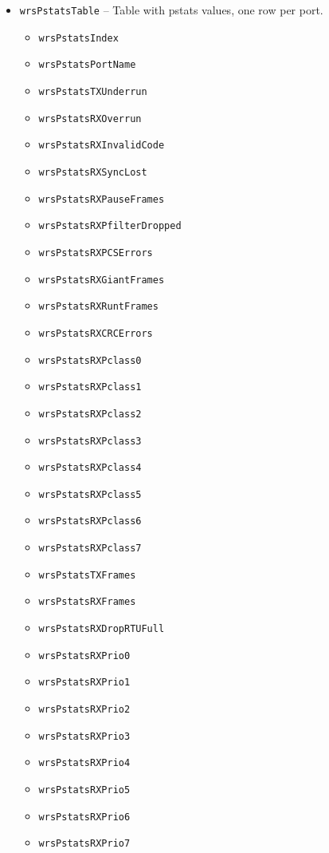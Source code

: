 \begin{itemize}
  \item \texttt{wrsPstatsTable} -- Table with pstats values, one row per port.
    \begin{itemize}
      \item \texttt{wrsPstatsIndex}
      \item \texttt{wrsPstatsPortName}
      \item \texttt{wrsPstatsTXUnderrun}
      \item \texttt{wrsPstatsRXOverrun}
      \item \texttt{wrsPstatsRXInvalidCode}
      \item \texttt{wrsPstatsRXSyncLost}
      \item \texttt{wrsPstatsRXPauseFrames}
      \item \texttt{wrsPstatsRXPfilterDropped}
      \item \texttt{wrsPstatsRXPCSErrors}
      \item \texttt{wrsPstatsRXGiantFrames}
      \item \texttt{wrsPstatsRXRuntFrames}
      \item \texttt{wrsPstatsRXCRCErrors}
      \item \texttt{wrsPstatsRXPclass0}
      \item \texttt{wrsPstatsRXPclass1}
      \item \texttt{wrsPstatsRXPclass2}
      \item \texttt{wrsPstatsRXPclass3}
      \item \texttt{wrsPstatsRXPclass4}
      \item \texttt{wrsPstatsRXPclass5}
      \item \texttt{wrsPstatsRXPclass6}
      \item \texttt{wrsPstatsRXPclass7}
      \item \texttt{wrsPstatsTXFrames}
      \item \texttt{wrsPstatsRXFrames}
      \item \texttt{wrsPstatsRXDropRTUFull}
      \item \texttt{wrsPstatsRXPrio0}
      \item \texttt{wrsPstatsRXPrio1}
      \item \texttt{wrsPstatsRXPrio2}
      \item \texttt{wrsPstatsRXPrio3}
      \item \texttt{wrsPstatsRXPrio4}
      \item \texttt{wrsPstatsRXPrio5}
      \item \texttt{wrsPstatsRXPrio6}
      \item \texttt{wrsPstatsRXPrio7}

\end{itemize}
\end{itemize}
